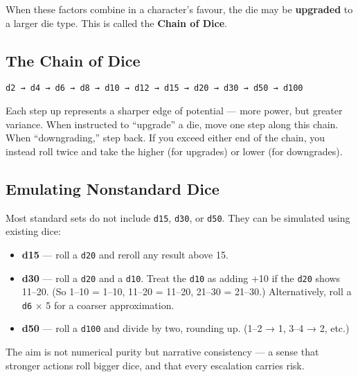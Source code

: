 When these factors combine in a character’s favour, the die may be \textbf{upgraded} to a larger die type.  
This is called the \textbf{Chain of Dice}.

\subsection*{The Chain of Dice}

\noindent
\texttt{d2 → d4 → d6 → d8 → d10 → d12 → d15 → d20 → d30 → d50 → d100}

\noindent
Each step up represents a sharper edge of potential — more power, but greater variance.  
When instructed to “upgrade” a die, move one step along this chain.  
When “downgrading,” step back.  
If you exceed either end of the chain, you instead roll twice and take the higher (for upgrades) or lower (for downgrades).

\subsection*{Emulating Nonstandard Dice}

Most standard sets do not include \texttt{d15}, \texttt{d30}, or \texttt{d50}.  
They can be simulated using existing dice:

\begin{itemize}
  \item \textbf{d15} — roll a \texttt{d20} and reroll any result above 15.  
  \item \textbf{d30} — roll a \texttt{d20} and a \texttt{d10}.  
  Treat the \texttt{d10} as adding +10 if the \texttt{d20} shows 11–20.  
  (So 1–10 = 1–10, 11–20 = 11–20, 21–30 = 21–30.)  
  Alternatively, roll a \texttt{d6} × 5 for a coarser approximation.
  \item \textbf{d50} — roll a \texttt{d100} and divide by two, rounding up.  
  (1–2 → 1, 3–4 → 2, etc.)
\end{itemize}

The aim is not numerical purity but narrative consistency — a sense that stronger actions roll bigger dice, and that every escalation carries risk.
